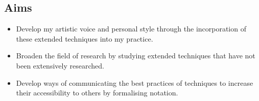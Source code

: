 

\subsection{Aims}
\begin{itemize}
   \item Develop my artistic voice and personal style through the incorporation of these extended techniques into my practice.
   \item Broaden the field of research by studying extended techniques that have not been extensively researched.
   \item Develop ways of communicating the best practices of techniques to increase their accessibility to others by formalising notation.
\end{itemize}



